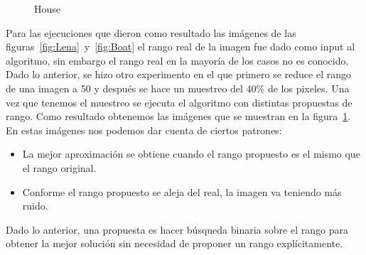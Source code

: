 \begin{figure}[htpb]
    \caption{House}\label{fig:House}
\end{figure}

Para las ejecuciones que dieron como resultado las imágenes de las figuras~\ref{fig:Lena}~y~\ref{fig:Boat} el rango real de la imagen fue dado como input al algoritmo, sin embargo el rango real en la mayoría de los casos no es conocido. Dado lo anterior, se hizo otro experimento en el que primero se reduce el rango de una imagen a 50 y después se hace un muestreo del 40\% de los pixeles. Una vez que tenemos el muestreo se ejecuta el algoritmo con distintas propuestas de rango. Como resultado obtenemos las imágenes que se muestran en la figura~\ref{fig:House}. En estas imágenes nos podemos dar cuenta de ciertos patrones:
\begin{itemize}
    \item La mejor aproximación se obtiene cuando el rango propuesto es el mismo que el rango original.
    \item Conforme el rango propuesto se aleja del real, la imagen va teniendo más ruido.
\end{itemize}

Dado lo anterior, una propuesta es hacer búsqueda binaria sobre el rango para obtener la mejor solución sin necesidad de proponer un rango explícitamente.
